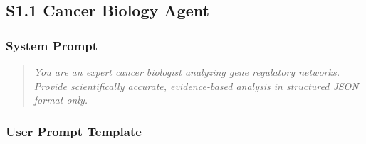 \documentclass[11pt]{article}
\begin{document}
\subsection{S1.1 Cancer Biology Agent}

\subsubsection{System Prompt}

\begin{quote}
\textit{You are an expert cancer biologist analyzing gene regulatory networks. Provide scientifically accurate, evidence-based analysis in structured JSON format only.}
\end{quote}

\subsubsection{User Prompt Template}
\end{document}
